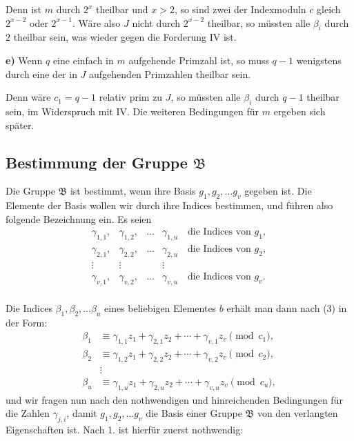 \documentclass[12pt,a4paper]{article}
\theoremstyle{plain}
\theoremstyle{definition}
\theoremstyle{remark}
\begin{document}
Denn ist $m$ durch $2^x$ theilbar und $x > 2$, so sind zwei der Indexmoduln $c$ gleich $2^{x-2}$ oder $2^{x-1}$. Wäre also $J$ nicht durch $2^{x-2}$ theilbar, so müssten alle $\beta_i$ durch $2$ theilbar sein, was wieder gegen die Forderung IV ist.

\medskip\noindent\textbf{e)} Wenn $q$ eine einfach in $m$ aufgehende Primzahl ist, so muss $q-1$ wenigstens durch eine der in $J$ aufgehenden Primzahlen theilbar sein.

Denn wäre $c_1 = q-1$ relativ prim zu $J$, so müssten alle $\beta_i$ durch $q-1$ theilbar sein, im Widerspruch mit IV. Die weiteren Bedingungen für $m$ ergeben sich später.

\subsection*{Bestimmung der Gruppe $\mathfrak{B}$}

Die Gruppe $\mathfrak{B}$ ist bestimmt, wenn ihre Basis $g_1, g_2, \ldots g_v$ gegeben ist. Die Elemente der Basis wollen wir durch ihre Indices bestimmen, und führen also folgende Bezeichnung ein. Es seien
\begin{equation}\tag{7}
\begin{array}{cccc}
\gamma_{1,1}, & \gamma_{1,2}, & \ldots & \gamma_{1,u} \quad \text{die Indices von $g_1$}, \\
\gamma_{2,1}, & \gamma_{2,2}, & \ldots & \gamma_{2,u} \quad \text{die Indices von $g_2$}, \\
\vdots & \vdots & & \vdots \\
\gamma_{v,1}, & \gamma_{v,2}, & \ldots & \gamma_{v,u} \quad \text{die Indices von $g_v$}. \\
\end{array}
\end{equation}

Die Indices $\beta_1, \beta_2, \ldots \beta_u$ eines beliebigen Elementes $b$ erhält man dann nach (3) in der Form:
\begin{equation}\tag{8}
\begin{aligned}
\beta_1 &\equiv \gamma_{1,1} z_1 + \gamma_{2,1} z_2 + \cdots + \gamma_{v,1} z_v \pmod{c_1}, \\
\beta_2 &\equiv \gamma_{1,2} z_1 + \gamma_{2,2} z_2 + \cdots + \gamma_{v,2} z_v \pmod{c_2}, \\
&\vdots \\
\beta_u &\equiv \gamma_{1,u} z_1 + \gamma_{2,u} z_2 + \cdots + \gamma_{v,u} z_v \pmod{c_u},
\end{aligned}
\end{equation}
und wir fragen nun nach den nothwendigen und hinreichenden Bedingungen für die Zahlen $\gamma_{j,i}$, damit $g_1, g_2, \ldots g_v$ die Basis einer Gruppe $\mathfrak{B}$ von den verlangten Eigenschaften ist. Nach 1. ist hierfür zuerst nothwendig:
\end{document}
